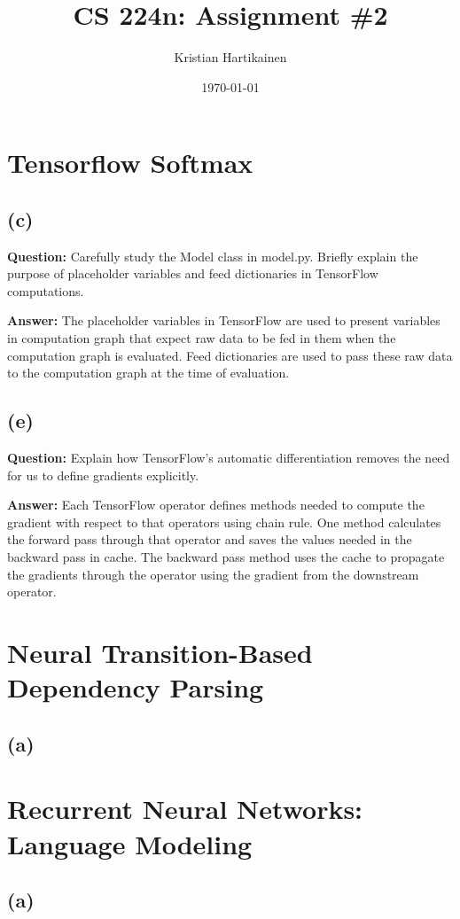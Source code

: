 \documentclass[11pt]{article}
\title{ CS 224n: Assignment \#2 }
\author{Kristian Hartikainen}
\date{\today}
\begin{document}
\maketitle

\section{Tensorflow Softmax}
\subsection*{(c)}
\textbf{Question:} Carefully study the Model class in model.py. Briefly explain the purpose
of placeholder variables and feed dictionaries in TensorFlow computations.

\textbf{Answer:} The placeholder variables in TensorFlow are used to present variables in computation graph that expect raw data to be fed in them when the computation graph is evaluated. Feed dictionaries are used to pass these raw data to the computation graph at the time of evaluation.

\subsection*{(e)}
\textbf{Question:} Explain how TensorFlow’s automatic differentiation removes the need for us to define gradients explicitly.

\textbf{Answer:} Each TensorFlow operator defines methods needed to compute the gradient with respect to that operators using chain rule. One method calculates the forward pass through that operator and saves the values needed in the backward pass in cache. The backward pass method uses the cache to propagate the gradients through the operator using the gradient from the downstream operator.

\section{Neural Transition-Based Dependency Parsing}
\subsection*{(a)}

\section{Recurrent Neural Networks: Language Modeling}
\subsection*{(a)}
\end{document}
